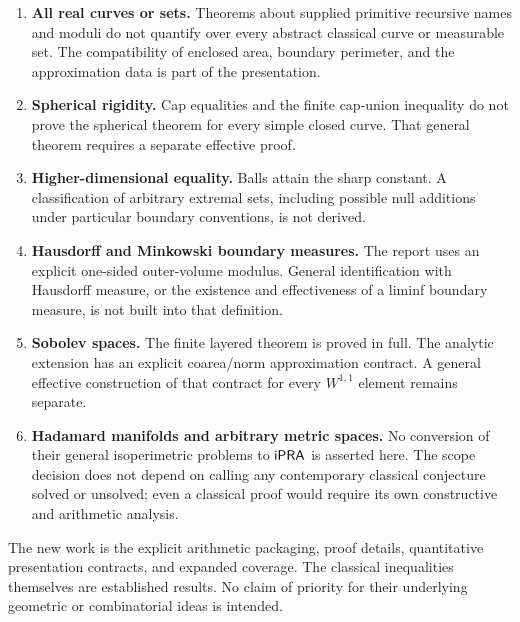 \begin{enumerate}
\item \textbf{All real curves or sets.} Theorems about supplied primitive
recursive names and moduli do not quantify over every abstract classical
curve or measurable set. The compatibility of enclosed area, boundary
perimeter, and the approximation data is part of the presentation.
\item \textbf{Spherical rigidity.} Cap equalities and the finite cap-union
inequality do not prove the spherical theorem for every simple closed
curve. That general theorem requires a separate effective proof.
\item \textbf{Higher-dimensional equality.} Balls attain the sharp
constant. A classification of arbitrary extremal sets, including possible
null additions under particular boundary conventions, is not derived.
\item \textbf{Hausdorff and Minkowski boundary measures.} The report uses
an explicit one-sided outer-volume modulus. General identification with
Hausdorff measure, or the existence and effectiveness of a liminf
boundary measure, is not built into that definition.
\item \textbf{Sobolev spaces.} The finite layered theorem is proved in
full. The analytic extension has an explicit coarea/norm approximation
contract. A general effective construction of that contract for every
\(W^{1,1}\) element remains separate.
\item \textbf{Hadamard manifolds and arbitrary metric spaces.} No
conversion of their general isoperimetric problems to \(\mathsf{iPRA}\) is
asserted here. The scope decision does not depend on calling any
contemporary classical conjecture solved or unsolved; even a classical
proof would require its own constructive and arithmetic analysis.
\end{enumerate}

The new work is the explicit arithmetic packaging, proof details,
quantitative presentation contracts, and expanded coverage. The classical
inequalities themselves are established results. No claim of priority
for their underlying geometric or combinatorial ideas is intended.

